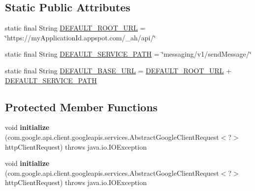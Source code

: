 \subsection*{Static Public Attributes}
\begin{DoxyCompactItemize}
\item 
static final String \hyperlink{classcom_1_1example_1_1lusifer_1_1myapplication_1_1backend_1_1messaging_1_1_messaging_a44833e9f16f61e31fdaa199b9c02a18b}{D\+E\+F\+A\+U\+L\+T\+\_\+\+R\+O\+O\+T\+\_\+\+U\+R\+L} = \char`\"{}https\+://my\+Application\+Id.\+appspot.\+com/\+\_\+ah/api/\char`\"{}
\item 
static final String \hyperlink{classcom_1_1example_1_1lusifer_1_1myapplication_1_1backend_1_1messaging_1_1_messaging_a7c1701efa3409a98f8c00f45dbd7253b}{D\+E\+F\+A\+U\+L\+T\+\_\+\+S\+E\+R\+V\+I\+C\+E\+\_\+\+P\+A\+T\+H} = \char`\"{}messaging/v1/send\+Message/\char`\"{}
\item 
static final String \hyperlink{classcom_1_1example_1_1lusifer_1_1myapplication_1_1backend_1_1messaging_1_1_messaging_ae4dac369831e0fc5c746d6e72aeb77d7}{D\+E\+F\+A\+U\+L\+T\+\_\+\+B\+A\+S\+E\+\_\+\+U\+R\+L} = \hyperlink{classcom_1_1example_1_1lusifer_1_1myapplication_1_1backend_1_1messaging_1_1_messaging_a44833e9f16f61e31fdaa199b9c02a18b}{D\+E\+F\+A\+U\+L\+T\+\_\+\+R\+O\+O\+T\+\_\+\+U\+R\+L} + \hyperlink{classcom_1_1example_1_1lusifer_1_1myapplication_1_1backend_1_1messaging_1_1_messaging_a7c1701efa3409a98f8c00f45dbd7253b}{D\+E\+F\+A\+U\+L\+T\+\_\+\+S\+E\+R\+V\+I\+C\+E\+\_\+\+P\+A\+T\+H}
\end{DoxyCompactItemize}
\subsection*{Protected Member Functions}
\begin{DoxyCompactItemize}
\item 
\hypertarget{classcom_1_1example_1_1lusifer_1_1myapplication_1_1backend_1_1messaging_1_1_messaging_aaed8b404c1ff8a6d6b79bbbb83756b26}{}void {\bfseries initialize} (com.\+google.\+api.\+client.\+googleapis.\+services.\+Abstract\+Google\+Client\+Request$<$?$>$ http\+Client\+Request)  throws java.\+io.\+I\+O\+Exception \label{classcom_1_1example_1_1lusifer_1_1myapplication_1_1backend_1_1messaging_1_1_messaging_aaed8b404c1ff8a6d6b79bbbb83756b26}

\item 
\hypertarget{classcom_1_1example_1_1lusifer_1_1myapplication_1_1backend_1_1messaging_1_1_messaging_aaed8b404c1ff8a6d6b79bbbb83756b26}{}void {\bfseries initialize} (com.\+google.\+api.\+client.\+googleapis.\+services.\+Abstract\+Google\+Client\+Request$<$?$>$ http\+Client\+Request)  throws java.\+io.\+I\+O\+Exception \label{classcom_1_1example_1_1lusifer_1_1myapplication_1_1backend_1_1messaging_1_1_messaging_aaed8b404c1ff8a6d6b79bbbb83756b26}

\end{DoxyCompactItemize}



